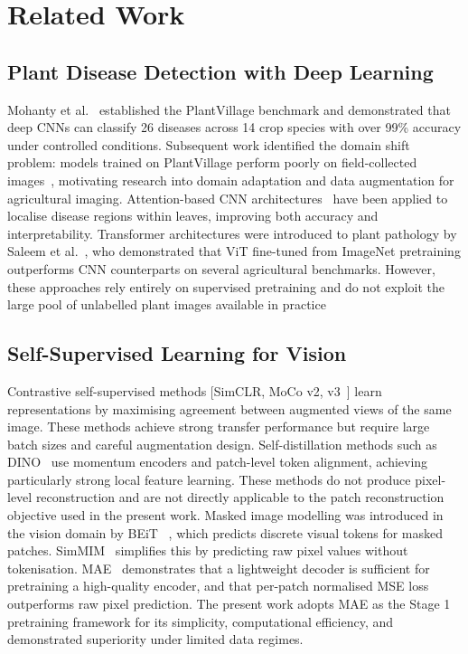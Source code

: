 \documentclass[conference]{IEEEtran}
\begin{document}
\section{Related Work}

\subsection{Plant Disease Detection with Deep Learning}

Mohanty et al.~\cite{14} established the PlantVillage benchmark and demonstrated that deep CNNs can classify 26 diseases across 14 crop species with over 99\% accuracy under controlled conditions. Subsequent work identified the domain shift problem: models trained on PlantVillage perform poorly on field-collected images~\cite{18}, motivating research into domain adaptation and data augmentation for agricultural imaging.
Attention-based CNN architectures~\cite{16} have been applied to localise disease regions within leaves, improving both accuracy and interpretability. Transformer architectures were introduced to plant pathology by Saleem et al.~\cite{21}, who demonstrated that ViT fine-tuned from ImageNet pretraining outperforms CNN counterparts on several agricultural benchmarks. However, these approaches rely entirely on supervised pretraining and do not exploit the large pool of unlabelled plant images available in practice


\subsection{Self-Supervised Learning for Vision}

Contrastive self-supervised methods [SimCLR, MoCo v2, v3~\cite{8}] learn representations by maximising agreement between augmented views of the same image. These methods achieve strong transfer performance but require large batch sizes and careful augmentation design. Self-distillation methods such as DINO~\cite{7} use momentum encoders and patch-level token alignment, achieving particularly strong local feature learning. These methods do not produce pixel-level reconstruction and are not directly applicable to the patch reconstruction objective used in the present work.
Masked image modelling was introduced in the vision domain by BEiT ~\cite{20}, which predicts discrete visual tokens for masked patches. SimMIM~\cite{9} simplifies this by predicting raw pixel values without tokenisation. MAE~\cite{1} demonstrates that a lightweight decoder is sufficient for pretraining a high-quality encoder, and that per-patch normalised MSE loss outperforms raw pixel prediction. The present work adopts MAE as the Stage 1 pretraining framework for its simplicity, computational efficiency, and demonstrated superiority under limited data regimes.
\end{document}
